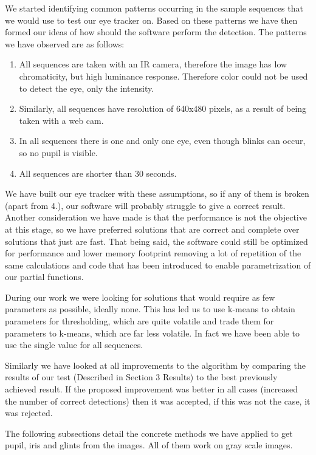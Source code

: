 We started identifying common patterns occurring in the sample sequences that we would use to test our eye tracker on. Based on these patterns we have then formed our ideas of how should the software perform the detection. The patterns we have observed are as follows:

\begin{enumerate}

\item All sequences are taken with an IR camera, therefore the image has low chromaticity, but high luminance response. Therefore color could not be used to detect the eye, only the intensity.
\item Similarly, all sequences have resolution of 640x480 pixels, as a result of being taken with a web cam.
\item In all sequences there is one and only one eye, even though blinks can occur, so no pupil is visible.
\item All sequences are shorter than 30 seconds.

\end{enumerate}

We have built our eye tracker with these assumptions, so if any of them is broken (apart from 4.), our software will probably struggle to give a correct result. Another consideration we have made is that the performance is not the objective at this stage, so we have preferred solutions that are correct and complete over solutions that just are fast. That being said, the software could still be optimized for performance and lower memory footprint removing a lot of repetition of the same calculations and code that has been introduced to enable parametrization of our partial functions.

During our work we were looking for solutions that would require as few parameters as possible, ideally none. This has led us to use k-means to obtain parameters for thresholding, which are quite volatile and trade them for parameters to k-means, which are far less volatile. In fact we have been able to use the single value for all sequences.

Similarly we have looked at all improvements to the algorithm by comparing the results of our test (Described in Section 3 Results) to the best previously achieved result. If the proposed improvement was better in all cases (increased the number of correct detections) then it was accepted, if this was not the case, it was rejected.

The following subsections detail the concrete methods we have applied to get pupil, iris and glints from the images. All of them work on gray scale images.

